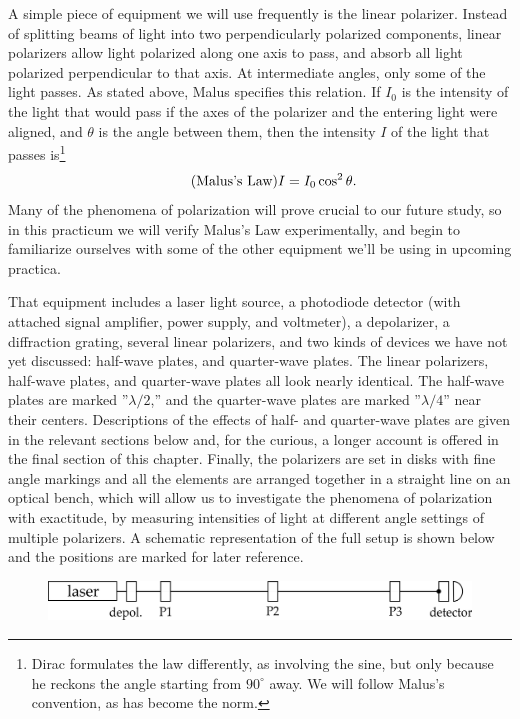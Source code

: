 A simple piece of equipment we will use frequently is the linear polarizer. Instead of splitting beams of light into
two perpendicularly polarized components, linear polarizers allow light polarized along one axis to pass, 
and absorb all light polarized perpendicular to that axis. At intermediate angles, only some of the light passes.
As stated above, Malus specifies this relation. If $I_0$ is the intensity of the light that would pass if the axes of the polarizer and the entering light were aligned, and $\theta$ is the angle between them, then the intensity $I$ of the light 
that passes is\footnote{Dirac formulates the law differently, as involving the sine, but only because he reckons the angle starting from $90^{\circ}$ away. We will follow Malus's convention, as has become the norm.}
\begin{equation*}\tag{\text{Malus's Law}}
I = I_0 \cos^2 \theta.
\end{equation*}
Many of the phenomena of polarization will prove crucial to our future study, so in this practicum we will verify Malus's Law experimentally, and begin to familiarize ourselves with some of the other equipment we'll be using in upcoming practica. 

That equipment includes a laser light source, a photodiode detector (with attached signal amplifier, power supply, and voltmeter), a depolarizer, a diffraction grating, several linear polarizers,  and two kinds of devices we have not yet discussed: half-wave plates, and quarter-wave plates.  The linear polarizers, half-wave plates, and quarter-wave plates all look nearly identical.  The half-wave plates are marked ''$\lambda /2$,'' and the quarter-wave plates are marked ''$\lambda /4$'' near their centers.  Descriptions of the effects of half- and quarter-wave plates are given in the relevant sections below and, for the curious, a longer account is offered in the final section of this chapter. Finally, the polarizers are set in disks with fine angle markings and all the elements are arranged together in a straight line on an optical bench, which will allow us to investigate the phenomena of polarization with exactitude, by measuring intensities of light at different angle settings of multiple polarizers. A schematic representation of the full setup is shown below and the positions are marked for later reference.

\begin{figure}[h] %
\centering
    \includegraphics[width=4.5233in,height=0.4133in]{images/11_polarization/polarization-setup.png}
\end{figure}

